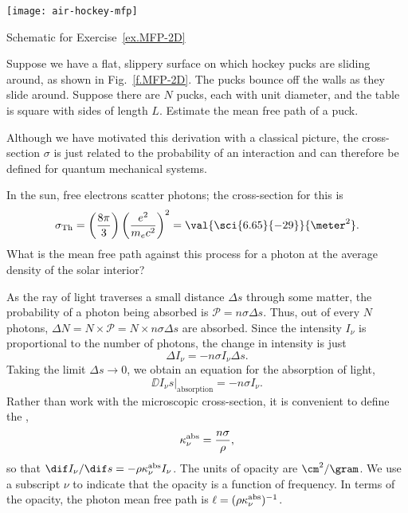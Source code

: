 \begin{marginfigure}[3\baselineskip]
    \texttt{[image: air-hockey-mfp]}
    \caption[Mean free path of a hockey puck]{\label{f.MFP-2D}Schematic for Exercise~\ref{ex.MFP-2D}}
\end{marginfigure}
\begin{exercisebox}\label{ex.MFP-2D}
    Suppose we have a flat, slippery surface on which hockey pucks are sliding around, as shown in Fig.~\ref{f.MFP-2D}. The pucks bounce off the walls as they slide around.  Suppose there are $N$ pucks, each with unit diameter, and the table is square with sides of length $L$.  Estimate the mean free path of a puck.
\end{exercisebox}

Although we have motivated this derivation with a classical picture, the cross-section $\sigma$ is just related to the probability of an interaction and can therefore be defined for quantum mechanical systems.

\begin{exercisebox}\label{ex.MFP}
    In the sun, free electrons scatter photons; the cross-section for this is
    \[
    \sigma_{\mathrm{Th}} = \left(\frac{8\pi}{3}\right)\left(\frac{e^2}{m_e c^2}\right)^2 = \val{\sci{6.65}{-29}}{\meter^2}.
    \]
    What is the mean free path against this process for a photon at the average density of the solar interior?
\end{exercisebox}

As the ray of light traverses a small distance $\Delta s$ through some matter, the probability of a photon being absorbed is $\mathcal{P} = n\sigma\Delta s$. Thus, out of every $N$ photons, $\Delta N = N \times\mathcal{P} = N\times n\sigma\Delta s$ are absorbed. Since the intensity $I_{\nu}$ is proportional to the number of photons, the change in intensity is just
\[ \Delta I_{\nu} = -n\sigma I_{\nu}\Delta s. \]
Taking the limit $\Delta s\to0$, we obtain an equation for the absorption of light,
\begin{equation}\label{e.absorption-microscopic}
\left.\DD{I_{\nu}}{s}\right|_{\mathrm{absorption}} = -n\sigma I_{\nu}.
\end{equation}
Rather than work with the microscopic cross-section, it is convenient to define the ,
\[
	\kappa_\nu^{\mathrm{abs}} = \frac{n\sigma}{\rho},
\]
so that $\dif I_{\nu}/\dif s = -\rho\kapabs I_{\nu}$. The units of opacity are $\cm^{2}/\gram$. We use a subscript $\nu$ to indicate that the opacity is a function of frequency. In terms of the opacity, the photon mean free path is $\ell = (\rho\kappa_\nu^{\mathrm{abs}})^{-1}$.

